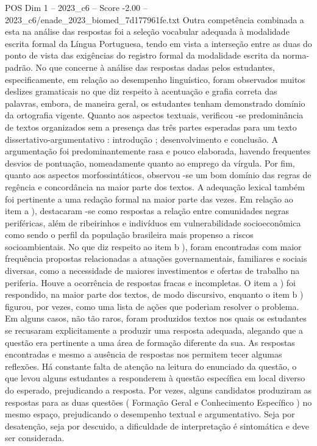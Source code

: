 \begin{textsample}{POS Dim 1 – 2023\_c6 – Score -2.00 – 2023\_c6/enade\_2023\_biomed\_7d177961fe.txt}
Outra competência combinada a esta na análise das respostas foi a seleção vocabular adequada à modalidade escrita formal da Língua Portuguesa, tendo em vista a interseção entre as duas do ponto de vista das exigências do registro formal da modalidade escrita da norma-padrão.
No que concerne à análise das respostas dadas pelos estudantes, especificamente, em relação ao desempenho linguístico, foram observados muitos deslizes gramaticais no que diz respeito à acentuação e grafia correta das palavras, embora, de maneira geral, os estudantes tenham demonstrado domínio da ortografia vigente.
Quanto aos aspectos textuais, verificou -se predominância de textos organizados sem a presença das três partes esperadas para um texto dissertativo-argumentativo : introdução ; desenvolvimento e conclusão.
A argumentação foi predominantemente rasa e pouco elaborada, havendo frequentes desvios de pontuação, nomeadamente quanto ao emprego da vírgula.
Por fim, quanto aos aspectos morfossintáticos, observou -se um bom domínio das regras de regência e concordância na maior parte dos textos.
A adequação lexical também foi pertinente a uma redação formal na maior parte das vezes.
Em relação ao item a ), destacaram -se como respostas a relação entre comunidades negras periféricas, além de ribeirinhos e indivíduos em vulnerabilidade socioeconômica como sendo o perfil da população brasileira mais propenso a riscos socioambientais.
No que diz respeito ao item b ), foram encontradas com maior frequência propostas relacionadas a atuações governamentais, familiares e sociais diversas, como a necessidade de maiores investimentos e ofertas de trabalho na periferia.
Houve a ocorrência de respostas fracas e incompletas.
O item a ) foi respondido, na maior parte dos textos, de modo discursivo, enquanto o item b ) figurou, por vezes, como uma lista de ações que poderiam resolver o problema.
Em alguns casos, não tão raros, foram produzidos textos nos quais os estudantes se recusaram explicitamente a produzir uma resposta adequada, alegando que a questão era pertinente a uma área de formação diferente da sua.
As respostas encontradas e mesmo a ausência de respostas nos permitem tecer algumas reflexões.
Há constante falta de atenção na leitura do enunciado da questão, o que levou alguns estudantes a responderem à questão específica em local diverso do esperado, prejudicando a resposta.
Por vezes, alguns candidatos produziram as respostas para as duas questões ( Formação Geral e Conhecimento Específico ) no mesmo espaço, prejudicando o desempenho textual e argumentativo.
Seja por desatenção, seja por descuido, a dificuldade de interpretação é sintomática e deve ser considerada.

\end{textsample}
